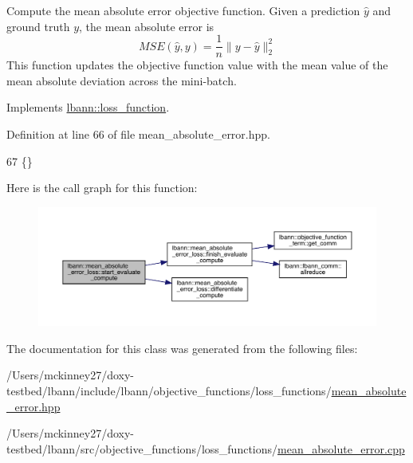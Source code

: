 Compute the mean absolute error objective function. Given a prediction $\hat{y}$ and ground truth $y$, the mean absolute error is \[ MSE(\hat{y}, y) = \frac{1}{n} \lVert y - \hat{y} \rVert_2^2 \] This function updates the objective function value with the mean value of the mean absolute deviation across the mini-\/batch. 

Implements \hyperlink{classlbann_1_1loss__function_a0bbe41060d788dc7a29f3737761a6f7d}{lbann\+::loss\+\_\+function}.



Definition at line 66 of file mean\+\_\+absolute\+\_\+error.\+hpp.


\begin{DoxyCode}
67                                                                        \{\}
\end{DoxyCode}
Here is the call graph for this function\+:\nopagebreak
\begin{figure}[H]
\begin{center}
\leavevmode
\includegraphics[width=350pt]{classlbann_1_1mean__absolute__error__loss_a6c93ac9c9dbcdec66e2a63caf25bccf9_cgraph}
\end{center}
\end{figure}


The documentation for this class was generated from the following files\+:\begin{DoxyCompactItemize}
\item 
/\+Users/mckinney27/doxy-\/testbed/lbann/include/lbann/objective\+\_\+functions/loss\+\_\+functions/\hyperlink{mean__absolute__error_8hpp}{mean\+\_\+absolute\+\_\+error.\+hpp}\item 
/\+Users/mckinney27/doxy-\/testbed/lbann/src/objective\+\_\+functions/loss\+\_\+functions/\hyperlink{mean__absolute__error_8cpp}{mean\+\_\+absolute\+\_\+error.\+cpp}\end{DoxyCompactItemize}
